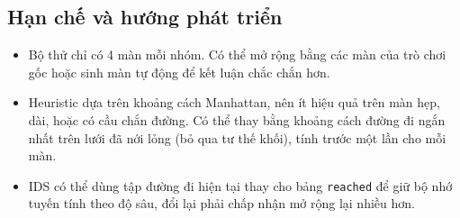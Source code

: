 \subsection{Hạn chế và hướng phát triển}

\begin{itemize}
\item Bộ thử chỉ có 4 màn mỗi nhóm. Có thể mở rộng bằng các màn của trò chơi gốc hoặc sinh màn tự động để kết luận chắc chắn hơn.
\item Heuristic dựa trên khoảng cách Manhattan, nên ít hiệu quả trên màn hẹp, dài, hoặc có cầu chắn đường. Có thể thay bằng khoảng cách đường đi ngắn nhất trên lưới đã nới lỏng (bỏ qua tư thế khối), tính trước một lần cho mỗi màn.
\item IDS có thể dùng tập đường đi hiện tại thay cho bảng \texttt{reached} để giữ bộ nhớ tuyến tính theo độ sâu, đổi lại phải chấp nhận mở rộng lại nhiều hơn.
\end{itemize}
